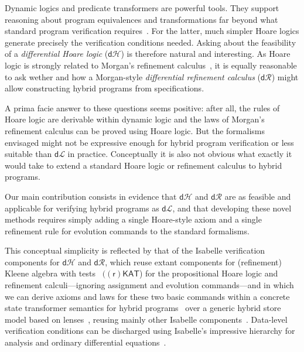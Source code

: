 \documentclass[envcountsame]{llncs}
\newcommand{\dL}{\mathsf{d}\mathcal{L}}
\newcommand{\dH}{\mathsf{d}\mathcal{H}}
\newcommand{\dR}{\mathsf{d}\mathcal{R}}
\begin{document}
Dynamic logics and predicate transformers are powerful tools. They
support reasoning about program equivalences and transformations
far beyond what standard program verification requires~\cite{BackW98}. For
the latter, much simpler Hoare logics generate precisely the
verification conditions needed.  Asking about the feasibility of a
\emph{differential Hoare logic} ($\dH$) is therefore natural and
interesting.  As Hoare logic is strongly related to Morgan's
refinement calculus~\cite{Morgan94}, it is equally reasonable to
ask wether and how a Morgan-style \emph{differential refinement calculus}
($\dR$) might allow constructing hybrid programs from specifications.

A prima facie answer to these questions seems positive: after all, the
rules of Hoare logic are derivable within dynamic logic and the laws
of Morgan's refinement calculus can be proved using Hoare logic. But
the formalisms envisaged might not be expressive enough for hybrid
program verification or less suitable than $\dL$ in
practice. Conceptually it is also not obvious what exactly it would
take to extend a standard Hoare logic or refinement calculus to hybrid
programs.

Our main contribution consists in evidence that $\dH$ and $\dR$ are as
feasible and applicable for verifying hybrid programs as $\dL$, and
that developing these novel methods requires simply adding a single
Hoare-style axiom and a single refinement rule for evolution commands
to the standard formalisms.

This conceptual simplicity is reflected by that of the Isabelle
verification components for $\dH$ and $\dR$, which reuse extant
components for (refinement) Kleene algebra with
tests~\cite{Kozen97,ArmstrongGS16,afp:vericomp} $(\mathsf{(r)KAT}$)
for the propositional Hoare logic and refinement calculi---ignoring
assignment and evolution commands---and in which we can derive axioms
and laws for these two basic commands within a concrete state
transformer semantics for hybrid programs~\cite{MuniveS19} over a
generic hybrid store model based on lenses~\cite{FosterZW16}, reusing
mainly other Isabelle components~\cite{afp:hybrid,afp:simon?}.
Data-level verification conditions can be discharged using Isabelle's
impressive hierarchy for analysis and ordinary differential
equations~\cite{ImmlerH12a}.
\end{document}
